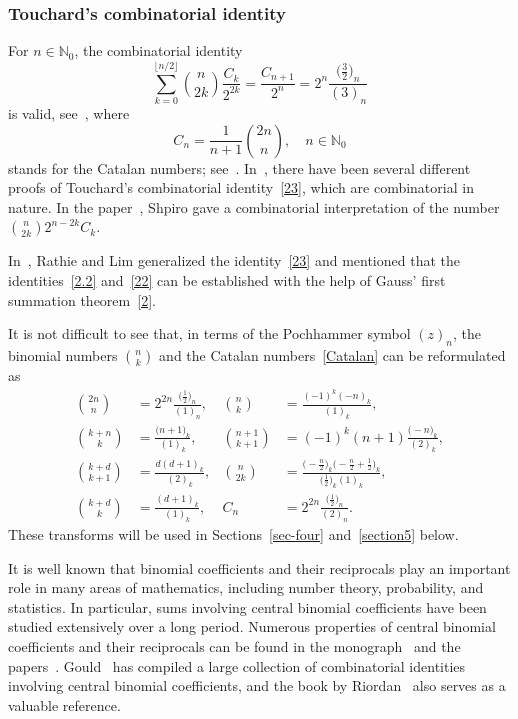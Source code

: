 \documentclass[reqno]{amsart}
\numberwithin{equation}{section}
\theoremstyle{plain}
\theoremstyle{remark}
\begin{document}
\subsubsection{Touchard's combinatorial identity}
For $n\in\mathbb{N}_0$, the combinatorial identity
\begin{equation}\label{23}
\sum_{k=0}^{\lfloor n/2\rfloor}\binom{n}{2k}\frac{C_k}{2^{2k}}=\frac{C_{n+1}}{2^n}=2^{n}\frac{\bigl(\frac{3}{2}\bigr)_n}{(3)_n}
\end{equation}
is valid, see~\cite{33}, where
\begin{equation}\label{Catalan}
C_n=\frac{1}{n+1}\binom{2n}{n}, \quad n\in\mathbb{N}_0
\end{equation}
stands for the Catalan numbers; see~\cite{18, Catalan-Int-Surv.tex}.
In~\cite{11, 29, 30}, there have been several different proofs of Touchard's combinatorial identity~\eqref{23}, which are combinatorial in nature. In the paper~\cite{31}, Shpiro gave a combinatorial interpretation of the number $\binom{n}{2k}2^{n-2k}C_k$.
\par
In~\cite{27}, Rathie and Lim generalized the identity~\eqref{23} and mentioned that the identities~\eqref{2.2} and~\eqref{22} can be established with the help of Gauss' first summation theorem~\eqref{2}.
\par
It is not difficult to see that, in terms of the Pochhammer symbol $(z)_n$, the binomial numbers $\binom{n}{k}$ and the Catalan numbers~\eqref{Catalan} can be reformulated as
\begin{align}\label{25}
\binom{2n}{n}&=2^{2n}\frac{\bigl(\frac{1}{2}\bigr)_n}{(1)_n}, & \binom{n}{k}&=\frac{(-1)^k(-n)_k}{(1)_k},\\
\label{27}
\binom{k+n}{k}&=\frac{\bigl(n+1\bigr)_k}{(1)_k}, & \binom{n+1}{k+1}&=(-1)^k(n+1)\frac{\bigl(-n\bigr)_k}{(2)_k},\\
\label{29}
\binom{k+d}{k+1}&=\frac{d(d+1)_k}{(2)_k}, & \binom{n}{2k}&=\frac{\bigl(-\frac{n}2\bigr)_k\bigl(-\frac{n}2+\frac12\bigr)_k}{\bigl(\frac12\bigr)_k(1)_k},\\
\label{26}
\binom{k+d}{k}&=\frac{(d+1)_k}{(1)_k}, & C_n&=2^{2n}\frac{\bigl(\frac{1}{2}\bigr)_n}{(2)_n}.
\end{align}
These transforms will be used in Sections~\ref{sec-four} and~\ref{section5} below.
\par
It is well known that binomial coefficients and their reciprocals play an important role in many areas of mathematics, including number theory, probability, and statistics. In particular, sums involving central binomial coefficients have been studied extensively over a long period. Numerous properties of central binomial coefficients and their reciprocals can be found in the monograph~\cite{18} and the papers~\cite{Catalan-Int-Surv.tex, ScienceAsia-2022-0169.tex, arcsin-power-wei.tex}. Gould~\cite{8} has compiled a large collection of combinatorial identities involving central binomial coefficients, and the book by Riordan~\cite{28} also serves as a valuable reference.
\end{document}
